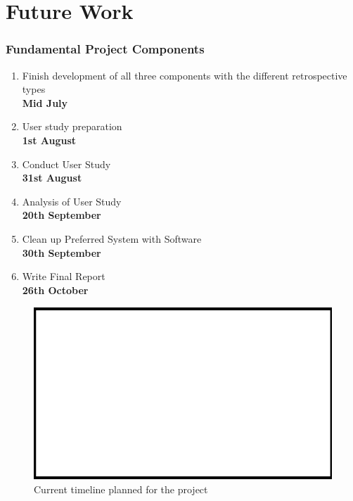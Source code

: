 \chapter{Future Work}\label{C:future}
\subsection{Fundamental Project Components}
\begin{enumerate}
\item Finish development of all three components with the different retrospective types \\ \textbf{Mid July}
\item User study preparation \\ \textbf{1st August}
\item Conduct User Study \\ \textbf{31st August}
\item Analysis of User Study \\ \textbf{20th September}
\item Clean up Preferred System with Software \\ \textbf{30th September}
\item Write Final Report \\ \textbf{26th October}  
\end{enumerate}
\begin{figure}[ht]
\centering
\includegraphics{placeholder}
\caption{Current timeline planned for the project}
\end{figure}